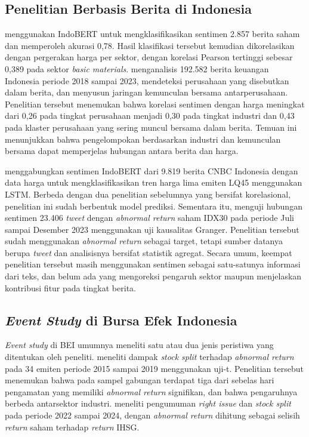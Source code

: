 \subsection{Penelitian Berbasis Berita di Indonesia}

\textcite{attar2024} menggunakan IndoBERT untuk mengklasifikasikan sentimen 2.857 berita saham dan memperoleh akurasi 0,78. Hasil klasifikasi tersebut kemudian dikorelasikan dengan pergerakan harga per sektor, dengan korelasi Pearson tertinggi sebesar 0,389 pada sektor \emph{basic materials}. \textcite{alamsyah2025} menganalisis 192.582 berita keuangan Indonesia periode 2018 sampai 2023, mendeteksi perusahaan yang disebutkan dalam berita, dan menyusun jaringan kemunculan bersama antarperusahaan. Penelitian tersebut menemukan bahwa korelasi sentimen dengan harga meningkat dari 0,26 pada tingkat perusahaan menjadi 0,30 pada tingkat industri dan 0,43 pada klaster perusahaan yang sering muncul bersama dalam berita. Temuan ini menunjukkan bahwa pengelompokan berdasarkan industri dan kemunculan bersama dapat memperjelas hubungan antara berita dan harga.

\textcite{kusuma2026} menggabungkan sentimen IndoBERT dari 9.819 berita CNBC Indonesia dengan data harga untuk mengklasifikasikan tren harga lima emiten LQ45 menggunakan LSTM. Berbeda dengan dua penelitian sebelumnya yang bersifat korelasional, penelitian ini sudah berbentuk model prediksi. Sementara itu, \textcite{elli2025} menguji hubungan sentimen 23.406 \emph{tweet} dengan \emph{abnormal return} saham IDX30 pada periode Juli sampai Desember 2023 menggunakan uji kausalitas Granger. Penelitian tersebut sudah menggunakan \emph{abnormal return} sebagai target, tetapi sumber datanya berupa \emph{tweet} dan analisisnya bersifat statistik agregat. Secara umum, keempat penelitian tersebut masih menggunakan sentimen sebagai satu-satunya informasi dari teks, dan belum ada yang mengoreksi pengaruh sektor maupun menjelaskan kontribusi fitur pada tingkat berita.

\subsection{\emph{Event Study} di Bursa Efek Indonesia}

\emph{Event study} di BEI umumnya meneliti satu atau dua jenis peristiwa yang ditentukan oleh peneliti. \textcite{fauzi2021} meneliti dampak \emph{stock split} terhadap \emph{abnormal return} pada 34 emiten periode 2015 sampai 2019 menggunakan uji-t. Penelitian tersebut menemukan bahwa pada sampel gabungan terdapat tiga dari sebelas hari pengamatan yang memiliki \emph{abnormal return} signifikan, dan bahwa pengaruhnya berbeda antarsektor industri. \textcite{sudirman2026} meneliti pengumuman \emph{right issue} dan \emph{stock split} pada periode 2022 sampai 2024, dengan \emph{abnormal return} dihitung sebagai selisih \emph{return} saham terhadap \emph{return} IHSG.

